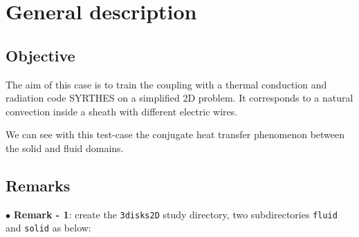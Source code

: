 
%
%
%
%


\section{General description}

        \subsection{Objective}

The aim of this case is to train the \CS  coupling with a thermal conduction and radiation
code SYRTHES on a simplified 2D problem. It corresponds to a natural convection inside a
sheath with different electric wires.

We can see with this test-case the conjugate heat transfer phenomenon between the solid
and fluid domains.

        \subsection{Remarks}
$\bullet$ {\bf Remark - 1}:  create the \texttt{3disks2D} study directory, two subdirectories
\texttt{fluid} and \texttt{solid} as below:\\

